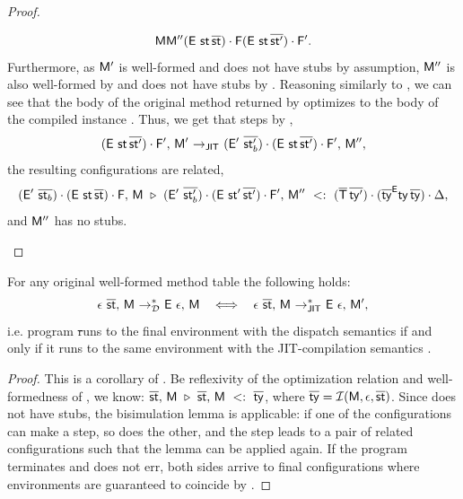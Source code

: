 {\begin{proof}
{\begin{itemize}
\[            {\mathsf{M}}{\mathsf{M}''}
            {(\mathsf{E}\ \mathsf{st}\,\overline{\mathsf{st} }) \cdot \mathsf{F} }
            {(\mathsf{E}\ \mathsf{st}\,\overline{\mathsf{st}'}) \cdot \mathsf{F}'}.
      \]
      Furthermore, as $\mathsf{M}'$ is well-formed and does not have stubs
      by assumption, $\mathsf{M}''$ is also well-formed by 
      and does not have stubs by .
      Reasoning similarly to , we can see that
      the body  of the original method returned by
      \dispatch{\mtbl}{\m}{\ol\Ty} optimizes to the body 
      of the compiled instance \msig\m{\ol\Ty}. Thus, we get that
       steps by ,
      \[
        \config{\stk{(\env\ \st\,\ol{\st'})}{\frm'}}{\mtbl'} \stepj
        \config{\stk{(\env'\ \ol{\st'_b})}{\stk{(\env\ \st\,\ol{\st'})}{\frm'}}}{\mtbl''},
      \]
      the resulting configurations are related,
      \[
        \optconfig
          {\stk{(\env'\ \ol{\st_b })}{\stk{(\env\ \st \,\ol{\st })}{\frm }}}
          {\mtbl}
          {\stk{(\env'\ \ol{\st'_b})}{\stk{(\env\ \st'\,\ol{\st'})}{\frm'}}}
          {\mtbl''}
          {\stk{(\ol\Ty\,\ol{\ty'})}{\stk{(\ol\ty^\env \ty\,\ol\ty)}{\Delta}}},
      \]
      and $\mathsf{M}''$ has no stubs.
  \end{itemize}
}
\end{proof}

\begin{theorem}\label{thm:disp-jit-equiv}
  For any original well-formed method table \mtbl the following holds:
  \[
    \config{\done\ \ol\st}{\mtbl} \stepdmul \config{\env\ \done}{\mtbl}
    \ \ \iff\ \
    \config{\done\ \ol\st}{\mtbl} \stepjmul \config{\env\ \done}{\mtbl'},
  \]
  i.e. program \ol\st runs to the final environment \env with the dispatch
  semantics \stepd if and only if it runs to the same environment with
  the JIT-compilation semantics \stepj.
\end{theorem}
\begin{proof}
  This is a corollary of . Be reflexivity of the
  optimization relation and well-formedness of \mtbl, we know:
  $\overline{\mathsf{st}},\, \mathsf{M}\ \triangleright\ \overline{\mathsf{st}},\, \mathsf{M}\ <:\ \overline{\mathsf{ty}}$,
  where $\overline{\mathsf{ty}} = \operatorname{\mathcal{I}}(\mathsf{M}, \epsilon, \overline{\mathsf{st}})$. Since \mtbl does not have
  stubs, the bisimulation lemma is applicable: if one of the configurations can
  make a step, so does the other, and the step leads to a pair of related
  configurations such that the lemma can be applied again. If the program
  terminates and does not err,
  both sides arrive to final configurations where environments are
  guaranteed to coincide by \SC{O-Stack}.
\end{proof}

}

